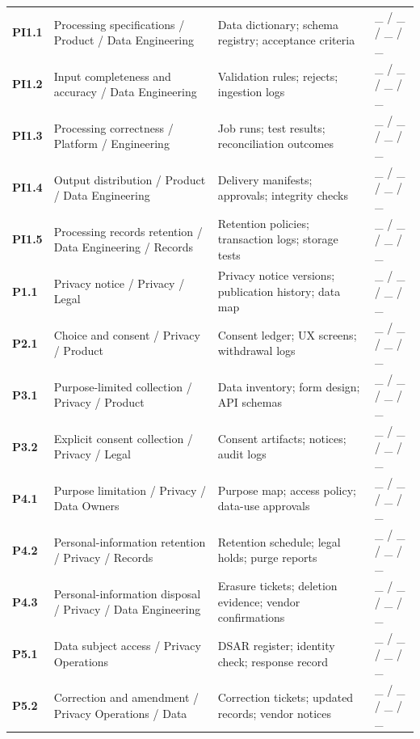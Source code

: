 \documentclass[10pt,oneside]{report}
\begin{document}
\begin{longtable}{@{}p{0.63in}p{2.13in}p{2.28in}p{0.92in}@{}}
\addlinespace[3pt]
\textbf{PI1.1} & Processing specifications / Product / Data Engineering & Data dictionary; schema registry; acceptance criteria & \_ / \_ / \_ / \_ \\
\addlinespace[3pt]
\textbf{PI1.2} & Input completeness and accuracy / Data Engineering & Validation rules; rejects; ingestion logs & \_ / \_ / \_ / \_ \\
\addlinespace[3pt]
\textbf{PI1.3} & Processing correctness / Platform / Engineering & Job runs; test results; reconciliation outcomes & \_ / \_ / \_ / \_ \\
\addlinespace[3pt]
\textbf{PI1.4} & Output distribution / Product / Data Engineering & Delivery manifests; approvals; integrity checks & \_ / \_ / \_ / \_ \\
\addlinespace[3pt]
\textbf{PI1.5} & Processing records retention / Data Engineering / Records & Retention policies; transaction logs; storage tests & \_ / \_ / \_ / \_ \\
\addlinespace[3pt]
\textbf{P1.1} & Privacy notice / Privacy / Legal & Privacy notice versions; publication history; data map & \_ / \_ / \_ / \_ \\
\addlinespace[3pt]
\textbf{P2.1} & Choice and consent / Privacy / Product & Consent ledger; UX screens; withdrawal logs & \_ / \_ / \_ / \_ \\
\addlinespace[3pt]
\textbf{P3.1} & Purpose-limited collection / Privacy / Product & Data inventory; form design; API schemas & \_ / \_ / \_ / \_ \\
\addlinespace[3pt]
\textbf{P3.2} & Explicit consent collection / Privacy / Legal & Consent artifacts; notices; audit logs & \_ / \_ / \_ / \_ \\
\addlinespace[3pt]
\textbf{P4.1} & Purpose limitation / Privacy / Data Owners & Purpose map; access policy; data-use approvals & \_ / \_ / \_ / \_ \\
\addlinespace[3pt]
\textbf{P4.2} & Personal-information retention / Privacy / Records & Retention schedule; legal holds; purge reports & \_ / \_ / \_ / \_ \\
\addlinespace[3pt]
\textbf{P4.3} & Personal-information disposal / Privacy / Data Engineering & Erasure tickets; deletion evidence; vendor confirmations & \_ / \_ / \_ / \_ \\
\addlinespace[3pt]
\textbf{P5.1} & Data subject access / Privacy Operations & DSAR register; identity check; response record & \_ / \_ / \_ / \_ \\
\addlinespace[3pt]
\textbf{P5.2} & Correction and amendment / Privacy Operations / Data & Correction tickets; updated records; vendor notices & \_ / \_ / \_ / \_ \\

\end{longtable}
\end{document}
